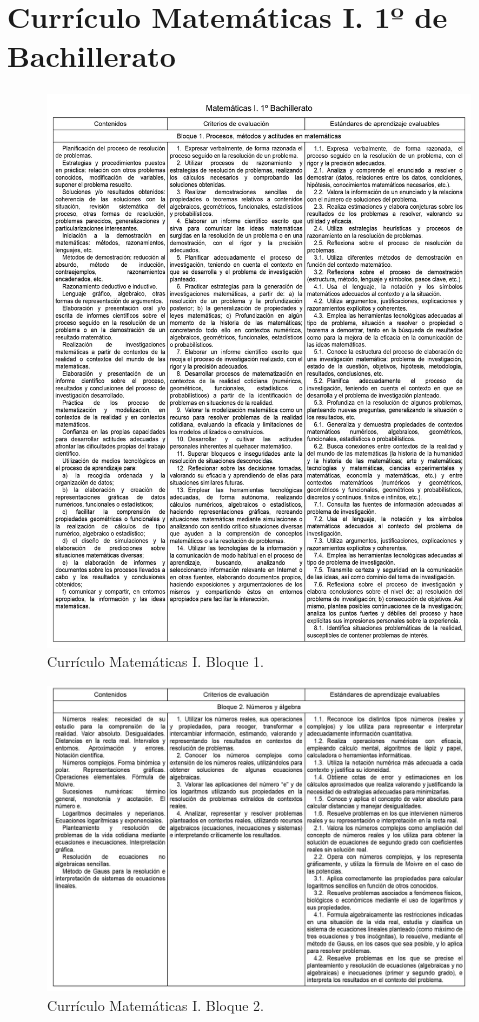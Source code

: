 \documentclass[a4paper, openright, 11pt, titlepage]{report}
\theoremstyle{definition}\newtheorem{defin}[propo]{Definition}
\theoremstyle{definition}\newtheorem{obser}[propo]{Remark}
\theoremstyle{definition}\newtheorem{ejem}[propo]{Ejemplo}
\theoremstyle{definition}\newtheorem{algoritmo}[propo]{Algoritmo}
\begin{document}
\chapter{Currículo Matemáticas I. 1º de Bachillerato}
 \begin{figure}[H]
     \centering
     \includegraphics[width = 1.1\textwidth]{Images/Apéndices/Apéndice B/curriculo1.png}
     \caption{Currículo Matemáticas I. Bloque 1.}
 \end{figure}
  \begin{figure}[H]
     \centering
     \includegraphics[width = 1.1\textwidth]{Images/Apéndices/Apéndice B/curriculo2.png}
     \caption{Currículo Matemáticas I. Bloque 2.}
 \end{figure}
\end{document}
